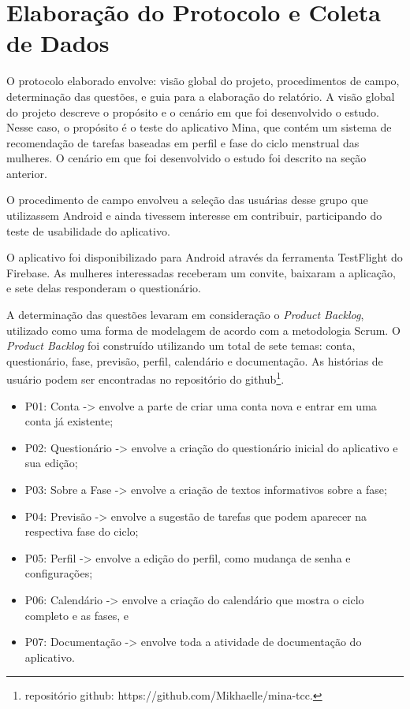 \section{Elaboração do Protocolo e Coleta de Dados}


O protocolo elaborado envolve: visão global do projeto, procedimentos de campo, determinação das questões, e guia para a elaboração do relatório.
A visão global do projeto descreve o propósito e o cenário em que foi desenvolvido o estudo. Nesse caso, o propósito é o teste do aplicativo Mina, que contém 
um sistema de recomendação de tarefas baseadas 
em perfil e fase do ciclo menstrual das mulheres. O cenário em que foi desenvolvido o estudo foi descrito na seção anterior.

O procedimento de campo envolveu a seleção das usuárias desse grupo que utilizassem Android e ainda tivessem interesse em contribuir, participando 
do teste de usabilidade do aplicativo.

O aplicativo foi disponibilizado para Android através da ferramenta TestFlight do Firebase. As mulheres interessadas receberam um convite, 
baixaram a aplicação, e sete 
delas responderam o questionário. 

A determinação das questões levaram em consideração o \emph{Product Backlog}, utilizado como uma 
forma de modelagem de acordo com a metodologia Scrum. 
O \emph{Product Backlog} foi construído utilizando um total de 
sete temas: conta, questionário, fase, previsão, perfil, 
calendário e documentação. As histórias de usuário podem ser 
encontradas no repositório do github\footnote{repositório github: https://github.com/Mikhaelle/mina-tcc.}.

\begin{itemize}
\item P01: Conta -> envolve a parte de criar uma conta nova e entrar em uma conta já existente;
\item P02: Questionário -> envolve a criação do questionário inicial do aplicativo e sua edição;
\item P03: Sobre a Fase -> envolve a criação de textos informativos sobre a fase;
\item P04: Previsão -> envolve a sugestão de tarefas que podem aparecer na respectiva fase do ciclo;
\item P05: Perfil -> envolve a edição do perfil, como mudança de senha e configurações;
\item P06: Calendário -> envolve a criação do calendário que mostra o ciclo completo e as fases, e
\item P07: Documentação -> envolve toda a atividade de documentação do aplicativo.

\end{itemize}

